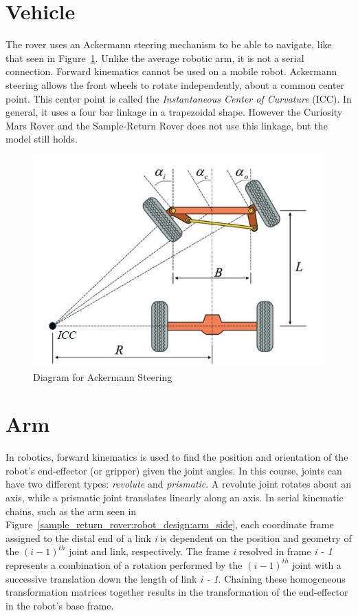 \section{Vehicle}
The rover uses an Ackermann steering mechanism to be able to navigate, like that seen in Figure~\ref{sample_return_rover:fwd_kin:ackermann}. Unlike the average robotic arm, it is not a serial connection. Forward kinematics cannot be used on a mobile robot. Ackermann steering allows the front wheels to rotate independently, about a common center point. This center point is called the \textit{Instantaneous Center of Curvature} (ICC). In general, it uses a four bar linkage in a trapezoidal shape. However the Curiosity Mars Rover and the Sample-Return Rover does not use this linkage, but the model still holds.

\begin{figure}[H]
	\centering
	\includegraphics[scale=0.65]{sections/robot-design/images/ackermann_steering.png}
	\caption{Diagram for Ackermann Steering}
	\label{sample_return_rover:fwd_kin:ackermann}
\end{figure}

\section{Arm}
In robotics, forward kinematics is used to find the position and orientation of the robot's end-effector (or gripper) given the joint angles. In this course, joints can have two different types: \textit{revolute} and \textit{prismatic}. A revolute joint rotates about an axis, while a prismatic joint translates linearly along an axis. In serial kinematic chains, such as the arm seen in Figure~\ref{sample_return_rover:robot_design:arm_side}, each coordinate frame assigned to the distal end of a link \textit{i} is dependent on the position and geometry of the $(i-1)^{th}$ joint and link, respectively. The frame \textit{i} resolved in frame \textit{i - 1} represents a combination of a rotation performed by the $(i-1)^{th}$ joint with a successive translation down the length of link \textit{i - 1}. Chaining these homogeneous transformation matrices together results in the transformation of the end-effector in the robot's base frame. \\

